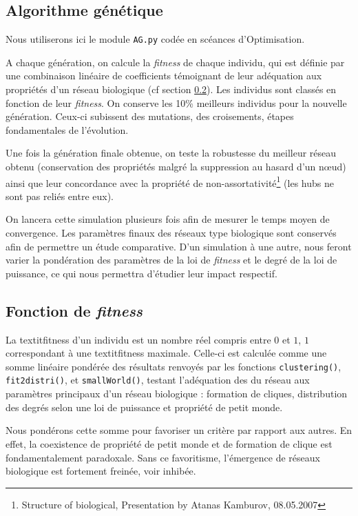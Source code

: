 \subsection{Algorithme génétique}
\label{algoG}
Nous utiliserons ici le module \texttt{AG.py} codée en scéances d'Optimisation. 

A chaque génération, on calcule la \textit{fitness} de chaque individu, qui est définie par une combinaison linéaire de coefficients témoignant de leur adéquation aux propriétés d'un réseau biologique (cf section \ref{fitness}).
Les individus sont classés en fonction de leur \textit{fitness}. On conserve les 10\% meilleurs individus pour la nouvelle génération. Ceux-ci subissent des mutations, des croisements, étapes fondamentales de l'évolution.

Une fois la génération finale obtenue, on teste la robustesse du meilleur réseau obtenu (conservation des propriétés malgré la suppression au hasard d'un nœud) ainsi que leur concordance avec la propriété de non-assortativité\footnote{Structure of biological, Presentation by Atanas Kamburov, 08.05.2007} (les hubs ne sont pas reliés entre eux).

On lancera cette simulation plusieurs fois afin de mesurer le temps moyen de convergence.
Les paramètres finaux des réseaux type \og biologique \fg sont conservés afin de permettre un étude comparative. D'un simulation à une autre, nous feront varier la pondération des paramètres de la loi de \textit{fitness} et le degré de la loi de puissance, ce qui nous permettra d'étudier leur impact respectif.

\subsection{Fonction de \textit{fitness}}
\label{fitness}
La textit{fitness} d'un individu est un nombre réel compris entre $0$ et $1$, $1$ correspondant à une textit{fitness} maximale.
Celle-ci est calculée comme une somme linéaire pondérée des résultats renvoyés par les fonctions \texttt{clustering()}, \texttt{fit2distri()}, et \texttt{smallWorld()}, testant l'adéquation des du réseau aux paramètres principaux d'un réseau biologique : formation de cliques, distribution des degrés selon une loi de puissance et propriété de petit monde.

\medskip
Nous pondérons cette somme pour favoriser un critère par rapport aux autres. En effet, la coexistence de propriété de petit monde et de formation de clique est fondamentalement paradoxale. Sans ce favoritisme, l'émergence de réseaux biologique est fortement freinée, voir inhibée.

